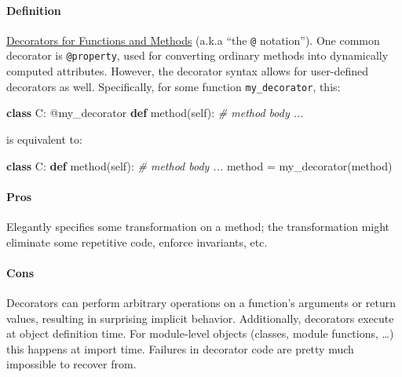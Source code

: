 \documentclass[
]{article}
\newenvironment{Shaded}{}{}
\newcommand{\AttributeTok}[1]{\textcolor[rgb]{0.49,0.56,0.16}{#1}}
\newcommand{\CommentTok}[1]{\textcolor[rgb]{0.38,0.63,0.69}{\textit{#1}}}
\newcommand{\KeywordTok}[1]{\textcolor[rgb]{0.00,0.44,0.13}{\textbf{#1}}}
\newcommand{\NormalTok}[1]{#1}
\newcommand{\OperatorTok}[1]{\textcolor[rgb]{0.40,0.40,0.40}{#1}}
\newcommand{\VariableTok}[1]{\textcolor[rgb]{0.10,0.09,0.49}{#1}}
\begin{document}
\paragraph{Definition}

\href{https://docs.python.org/3/glossary.html\#term-decorator}{Decorators
for Functions and Methods} (a.k.a ``the \texttt{@} notation''). One
common decorator is \texttt{@property}, used for converting ordinary
methods into dynamically computed attributes. However, the decorator
syntax allows for user-defined decorators as well. Specifically, for
some function \texttt{my\_decorator}, this:

\begin{samepage}
\begin{Shaded}
\begin{Highlighting}[]
\KeywordTok{class}\NormalTok{ C:}
    \AttributeTok{@my\_decorator}
    \KeywordTok{def}\NormalTok{ method(}\VariableTok{self}\NormalTok{):}
        \CommentTok{\# method body ...}
\end{Highlighting}
\end{Shaded}
\end{samepage}

is equivalent to:

\begin{samepage}
\begin{Shaded}
\begin{Highlighting}[]
\KeywordTok{class}\NormalTok{ C:}
    \KeywordTok{def}\NormalTok{ method(}\VariableTok{self}\NormalTok{):}
        \CommentTok{\# method body ...}
\NormalTok{    method }\OperatorTok{=}\NormalTok{ my\_decorator(method)}
\end{Highlighting}
\end{Shaded}
\end{samepage}

\paragraph{Pros}

Elegantly specifies some transformation on a method; the transformation
might eliminate some repetitive code, enforce invariants, etc.

\paragraph{Cons}

Decorators can perform arbitrary operations on a function's arguments or
return values, resulting in surprising implicit behavior. Additionally,
decorators execute at object definition time. For module-level objects
(classes, module functions, \ldots) this happens at import time.
Failures in decorator code are pretty much impossible to recover from.
\end{document}
